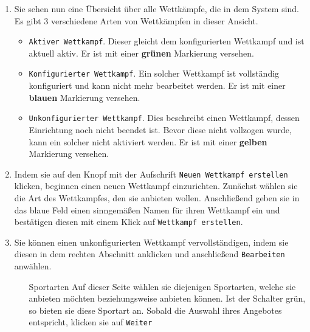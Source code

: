 \documentclass[11pt,a4paper,titlepage,german]{article}
\begin{document}
\begin{enumerate}
				\item {}
					Sie sehen nun eine Übersicht über alle Wettkämpfe, die in dem System sind. Es gibt 3 verschiedene Arten von Wettkämpfen in dieser Ansicht.
					\begin{itemize}
						\item \texttt{Aktiver Wettkampf}. Dieser gleicht dem konfigurierten Wettkampf und ist aktuell aktiv. Er ist mit einer \textbf{\color{CGreen}grünen} Markierung versehen.
						\item \texttt{Konfigurierter Wettkampf}. Ein solcher Wettkampf ist vollständig konfiguriert und kann nicht mehr bearbeitet werden. Er ist mit einer \textbf{\color{CBlue}blauen} Markierung versehen.
						\item \texttt{Unkonfigurierter Wettkampf}. Dies beschreibt einen Wettkampf, dessen Einrichtung noch nicht beendet ist. Bevor diese nicht vollzogen wurde, kann ein solcher nicht aktiviert werden. Er ist mit einer \textbf{\color{CYellow}gelben} Markierung versehen.
					\end{itemize}
				
				\item {}
					Indem sie auf den Knopf mit der Aufschrift \texttt{Neuen Wettkampf erstellen} klicken, beginnen einen neuen Wettkampf einzurichten. Zunächst wählen sie die Art des Wettkampfes, den sie anbieten wollen. Anschließend geben sie in das blaue Feld einen sinngemäßen Namen für ihren Wettkampf ein und bestätigen diesen mit einem Klick auf \texttt{Wettkampf erstellen}.
				
				\item {}
					Sie können einen unkonfigurierten Wettkampf vervollständigen, indem sie diesen in dem rechten Abschnitt anklicken und anschließend \texttt{Bearbeiten} anwählen.
				
					\begin{enumerate}
						\item[Sportarten] Auf dieser Seite wählen sie diejenigen Sportarten, welche sie anbieten möchten beziehungsweise anbieten können. Ist der Schalter grün, so bieten sie diese Sportart an. Sobald die Auswahl ihres Angebotes entspricht, klicken sie auf \texttt{Weiter}
						

\end{enumerate}
\end{enumerate}
\end{document}
